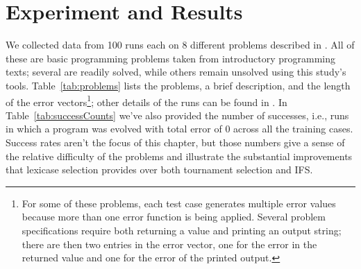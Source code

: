 \section{Experiment and Results}
\label{sec:experiment-results}

We collected data
from 100 runs each on 8 different problems described in \cite{Helmuth:2015:GECCO}. All of these are
basic programming problems taken from introductory programming texts; several are readily solved, while others
remain unsolved using this study's tools. Table~\ref{tab:problems} lists
the problems, a brief description, and the length of the error vectors\footnote{For some of these problems, each test case
	generates multiple error values because more than one error function is being applied. Several problem specifications
	require both returning a value and printing an output string; there are then two entries in the error vector, one for the
	error in the returned value and one for the error of the printed output.}; other details of the runs can be
found in \cite{Helmuth:2015:GECCO}. In Table~\ref{tab:successCounts} we've also provided the number 
of successes, i.e., runs in which a program was evolved with total error of 0 across all the training cases.
Success rates aren't the focus of this chapter, but those numbers give a sense of the relative
difficulty of the problems and illustrate the substantial improvements that lexicase selection
provides over both tournament selection and IFS.

